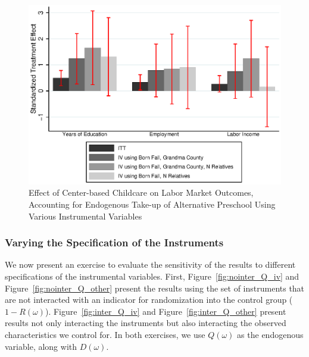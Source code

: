 \begin{appendices}
\begin{figure}[H]
		\caption{Effect of Center-based Childcare on Labor Market Outcomes, Accounting for Endogenous Take-up of Alternative Preschool Using Various Instrumental Variables} \label{fig:ins_inter_Q_iv2}
		\includegraphics[width=.7\columnwidth]{output/appendixplots/ins_inter_Q_iv_other.eps}
\end{figure}

\subsubsection{Varying the Specification of the Instruments}

\noindent We now present an exercise to evaluate the sensitivity of the results to different specifications of the instrumental variables. First, Figure~\ref{fig:nointer_Q_iv} and Figure~\ref{fig:nointer_Q_other} present the results using the set of instruments that are not interacted with an indicator for randomization into the control group ($1-R(\omega)$). Figure~\ref{fig:inter_Q_iv} and Figure~\ref{fig:inter_Q_other} present results not only interacting the instruments but also interacting the observed characteristics we control for. In both exercises, we use $Q(\omega)$ as the endogenous variable, along with $D(\omega)$.\\


\end{appendices}
